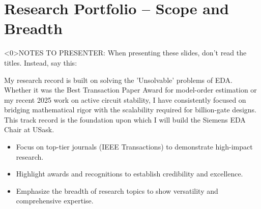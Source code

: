 \section{Research Portfolio -- Scope and Breadth}

\begin{frame}<0>{NOTES TO PRESENTER:}
	When presenting these slides, don't read the titles. Instead, say this:

	My research record is built on solving the 'Unsolvable' problems of EDA. Whether it was the Best Transaction Paper Award for model-order estimation or my recent 2025 work on active circuit stability, I have consistently focused on bridging mathematical rigor with the scalability required for billion-gate designs. This track record is the foundation upon which I will build the Siemens EDA Chair at USask.
	\begin{itemize}
		\item Focus on top-tier journals (IEEE Transactions) to demonstrate high-impact research.
		\item Highlight awards and recognitions to establish credibility and excellence.
		\item Emphasize the breadth of research topics to show versatility and comprehensive expertise.
	\end{itemize}
\end{frame}

